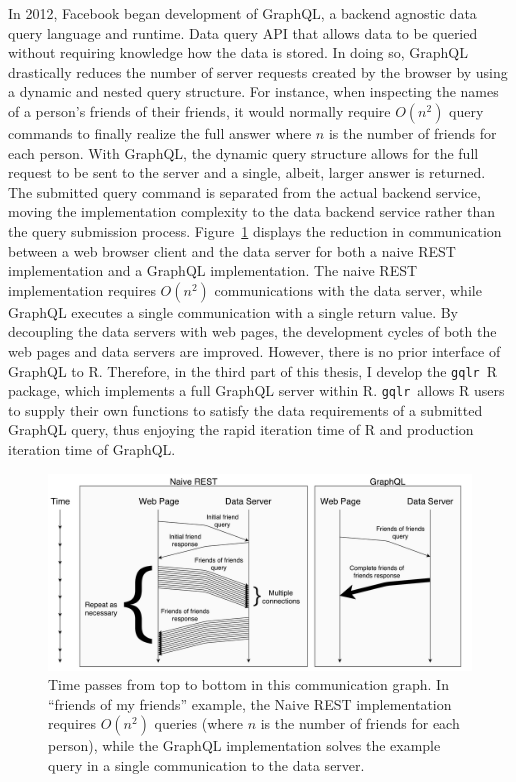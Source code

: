 \documentclass[stat,dissertation]{puthesis}\usepackage[]{graphicx}\usepackage{xcolor}
\newcommand{\pkg}[1]{\texttt{#1}}
\newcommand{\gqlr}{\pkg{gqlr}}
\begin{document}
In 2012, Facebook began development of GraphQL, a backend agnostic data query language and runtime.  Data query API that allows data to be queried without requiring knowledge how the data is stored.  In doing so, GraphQL drastically reduces the number of server requests created by the browser by using a dynamic and nested query structure.
For instance, when inspecting the names of a person's friends of their friends, it would normally require $O(n^2)$ query commands to finally realize the full answer where $n$ is the number of friends for each person.  With GraphQL, the dynamic query structure allows for the full request to be sent to the server and a single, albeit, larger answer is returned.  The submitted query command is separated from the actual backend service, moving the implementation complexity to the data backend service rather than the query submission process.
Figure~\ref{figs:intro_graphql} displays the reduction in communication between a web browser client and the data server for both a naive REST implementation and a GraphQL implementation.  The naive REST implementation requires $O(n^2)$ communications with the data server, while GraphQL executes a single communication with a single return value.
By decoupling the data servers with web pages, the development cycles of both the web pages and data servers are improved.
However, there is no prior interface of GraphQL to R. Therefore, in the third part of this thesis, I develop the \gqlr~R package, which implements a full GraphQL server within R.  \gqlr~allows R users to supply their own functions to satisfy the data requirements of a submitted GraphQL query, thus enjoying the rapid iteration time of R and production iteration time of GraphQL.


\begin{figure}[H]
  \label{figs:intro_graphql}
  \centering
  \includegraphics[width=\textwidth]{./figs/graphql_communication.pdf}
  \caption[``Friends of my friends'' GraphQL communication graph]{Time passes from top to bottom in this communication graph.  In ``friends of my friends'' example, the Naive REST implementation requires $O(n^2)$ queries (where $n$ is the number of friends for each person), while the GraphQL implementation solves the example query in a single communication to the data server.}
  \bigskip
\end{figure}
\end{document}
